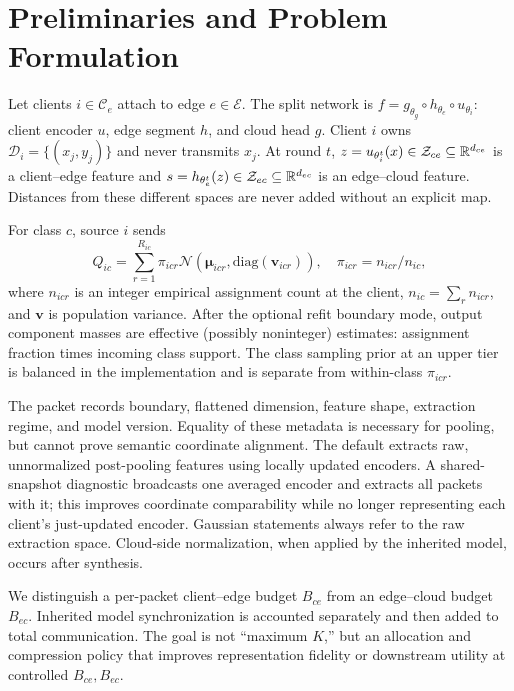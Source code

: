 \section{Preliminaries and Problem Formulation}\label{sec:problem}
Let clients $i\in\mathcal C_e$ attach to edge $e\in\mathcal E$. The split network is $f=g_{\theta_g}\circ h_{\theta_e}\circ u_{\theta_i}$: client encoder $u$, edge segment $h$, and cloud head $g$. Client $i$ owns $\mathcal D_i=\{(x_j,y_j)\}$ and never transmits $x_j$. At round $t$, $z=u_{\theta_i^t}(x)\in\mathcal Z_{ce}\subseteq\mathbb{R}^{d_{ce}}$ is a client--edge feature and $s=h_{\theta_e^t}(z)\in\mathcal Z_{ec}\subseteq\mathbb{R}^{d_{ec}}$ is an edge--cloud feature. Distances from these different spaces are never added without an explicit map.

For class $c$, source $i$ sends
\begin{equation}\label{eq:mixture}
 Q_{ic}=\sum_{r=1}^{R_{ic}}\pi_{icr}\mathcal N(\bm\mu_{icr},\mathrm{diag}(\bm v_{icr})),\quad
 \pi_{icr}=n_{icr}/n_{ic},
\end{equation}
where $n_{icr}$ is an integer empirical assignment count at the client, $n_{ic}=\sum_rn_{icr}$, and $\bm v$ is population variance. After the optional refit boundary mode, output component masses are effective (possibly noninteger) estimates: assignment fraction times incoming class support. The class sampling prior at an upper tier is balanced in the implementation and is separate from within-class $\pi_{icr}$.

The packet records boundary, flattened dimension, feature shape, extraction regime, and model version. Equality of these metadata is necessary for pooling, but cannot prove semantic coordinate alignment. The default extracts raw, unnormalized post-pooling features using locally updated encoders. A shared-snapshot diagnostic broadcasts one averaged encoder and extracts all packets with it; this improves coordinate comparability while no longer representing each client's just-updated encoder. Gaussian statements always refer to the raw extraction space. Cloud-side normalization, when applied by the inherited model, occurs after synthesis.

We distinguish a per-packet client--edge budget $B_{ce}$ from an edge--cloud budget $B_{ec}$. Inherited model synchronization is accounted separately and then added to total communication. The goal is not ``maximum $K$,'' but an allocation and compression policy that improves representation fidelity or downstream utility at controlled $B_{ce},B_{ec}$.


